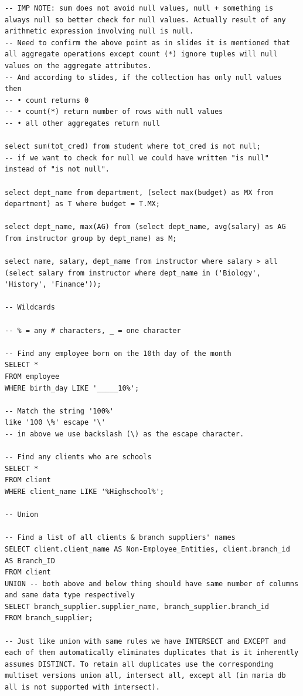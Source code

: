\documentclass[8pt, a4paper, oneside, twocolumn]{extarticle}
\begin{document}
\begin{verbatim}
-- IMP NOTE: sum does not avoid null values, null + something is always null so better check for null values. Actually result of any arithmetic expression involving null is null.
-- Need to confirm the above point as in slides it is mentioned that all aggregate operations except count (*) ignore tuples will null values on the aggregate attributes.
-- And according to slides, if the collection has only null values then 
-- • count returns 0
-- • count(*) return number of rows with null values
-- • all other aggregates return null

select sum(tot_cred) from student where tot_cred is not null;
-- if we want to check for null we could have written "is null" instead of "is not null".

select dept_name from department, (select max(budget) as MX from department) as T where budget = T.MX;

select dept_name, max(AG) from (select dept_name, avg(salary) as AG from instructor group by dept_name) as M;

select name, salary, dept_name from instructor where salary > all (select salary from instructor where dept_name in ('Biology', 'History', 'Finance'));

-- Wildcards

-- % = any # characters, _ = one character

-- Find any employee born on the 10th day of the month
SELECT *
FROM employee
WHERE birth_day LIKE '_____10%';

-- Match the string '100%'
like '100 \%' escape '\'
-- in above we use backslash (\) as the escape character.

-- Find any clients who are schools
SELECT *
FROM client
WHERE client_name LIKE '%Highschool%';

-- Union 

-- Find a list of all clients & branch suppliers' names
SELECT client.client_name AS Non-Employee_Entities, client.branch_id AS Branch_ID
FROM client
UNION -- both above and below thing should have same number of columns and same data type respectively
SELECT branch_supplier.supplier_name, branch_supplier.branch_id
FROM branch_supplier;

-- Just like union with same rules we have INTERSECT and EXCEPT and each of them automatically eliminates duplicates that is it inherently assumes DISTINCT. To retain all duplicates use the corresponding multiset versions union all, intersect all, except all (in maria db all is not supported with intersect).


\end{verbatim}
\end{document}
